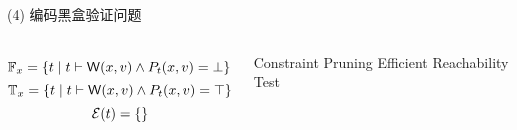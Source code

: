 \begin{frame}{}
	\begin{center}
		(4) 编码黑盒验证问题
	\end{center}
	\begin{columns}
		  \[
				\mathbb{F}_{x} = \{t \mid t \vdash {\sf W}(x, v)
				  \land P_{t}(x, v) = \bot\}
			\]
		  \[
				\mathbb{T}_{x} = \{t \mid t \vdash {\sf W}(x, v)
				  \land P_{t}(x, v) = \top\}
			\]
			\[
				\mathcal{E}(t) = \{\}
			\]
		  \pause
		  \begin{center}
				Constraint Pruning
				Efficient Reachability Test
			\end{center}
	\end{columns}
\end{frame}
